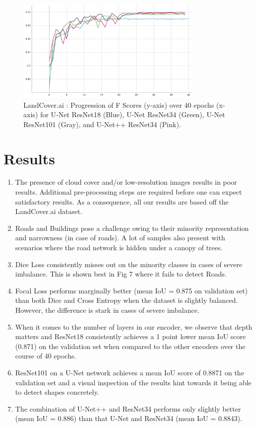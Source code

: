 \documentclass[conference]{IEEEtran}
\begin{document}
\begin{figure}[!h]
    \includegraphics[width=9cm, height=5cm]{images/encoders/encoders_fscore.png}
    \caption{LandCover.ai : Progression of F Scores (y-axis) over 40 epochs (x-axis) for U-Net ResNet18 (Blue), U-Net ResNet34 (Green), U-Net ResNet101 (Gray), and U-Net++ ResNet34 (Pink). }
\end{figure}


\section{Results}

\begin{enumerate}
    \item The presence of cloud cover and/or low-resolution images results in poor results. Additional pre-processing steps are required before one can expect satisfactory results. As a consequence, all our results are based off the LandCover.ai dataset.
    \item Roads and Buildings pose a challenge owing to their minority representation and narrowness (in case of roads). A lot of samples also present with scenarios where the road network is hidden under a canopy of trees.
    \item Dice Loss consistently misses out on the minority classes in cases of severe imbalance. This is shown best in Fig 7 where it fails to detect Roads.
    \item Focal Loss performs marginally better (mean IoU = 0.875 on validation set) than both Dice and Cross Entropy when the dataset is slightly balanced. However, the difference is stark in cases of severe imbalance.
    \item When it comes to the number of layers in our encoder, we observe that depth matters and ResNet18 consistently achieves a 1 point lower mean IoU score (0.871) on the validation set when compared to the other encoders over the course of 40 epochs.
    \item ResNet101 on a U-Net network achieves a mean IoU score of 0.8871 on the validation set and a visual inspection of the results hint towards it being able to detect shapes concretely.
    \item The combination of U-Net++ and ResNet34 performs only slightly better (mean IoU = 0.886) than that U-Net and ResNet34 (mean IoU = 0.8843).
\end{enumerate}
\end{document}
